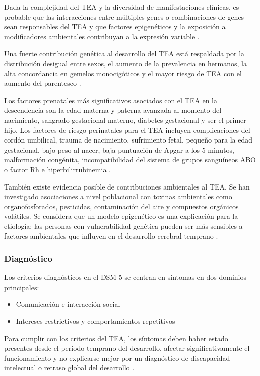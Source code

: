Dada la complejidad del TEA y la diversidad de manifestaciones clínicas, es
probable que las interacciones entre múltiples genes o combinaciones de genes
sean responsables del TEA y que factores epigenéticos y la exposición a
modificadores ambientales contribuyan a la expresión variable
\cite{AutismUpToDate}.

Una fuerte contribución genética al desarrollo del TEA está respaldada por la
distribución desigual entre sexos, el aumento de la prevalencia en hermanos,
la alta concordancia en gemelos monocigóticos y el mayor riesgo de TEA con el
aumento del parentesco \cite{AutismUpToDate}.

Los factores prenatales más significativos asociados con el TEA en la
descendencia son la edad materna y paterna avanzada al momento del nacimiento,
sangrado gestacional materno, diabetes gestacional y ser el primer hijo. Los
factores de riesgo perinatales para el TEA incluyen complicaciones del cordón
umbilical, trauma de nacimiento, sufrimiento fetal, pequeño para la edad
gestacional, bajo peso al nacer, baja puntuación de Apgar a los 5 minutos,
malformación congénita, incompatibilidad del sistema de grupos sanguíneos ABO
o factor Rh e hiperbilirrubinemia \cite{Boland2021-by}.

También existe evidencia posible de contribuciones ambientales al TEA. Se han
investigado asociaciones a nivel poblacional con toxinas ambientales como
organofosforados, pesticidas, contaminación del aire y compuestos orgánicos
volátiles. Se considera que un modelo epigenético es una explicación para la
etiología; las personas con vulnerabilidad genética pueden ser más sensibles a
factores ambientales que influyen en el desarrollo cerebral temprano
\cite{Nelson58}.

\subsubsection{Diagnóstico}
Los criterios diagnósticos en el DSM-5 se centran en síntomas en dos dominios 
principales:
    \begin{itemize}
        \item Comunicación e interacción social
        \item Intereses restrictivos y comportamientos repetitivos
    \end{itemize}
Para cumplir con los criterios del TEA, los síntomas deben haber estado
presentes desde el período temprano del desarrollo, afectar significativamente
el funcionamiento y no explicarse mejor por un diagnóstico de discapacidad
intelectual o retraso global del desarrollo \cite{DSM5TR}.

